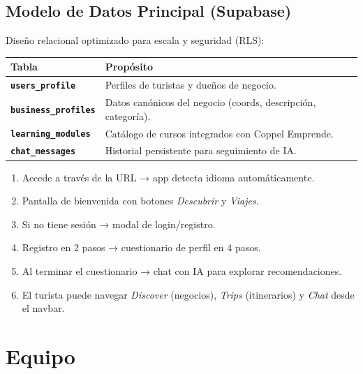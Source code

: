 \documentclass[11pt,a4paper]{article}
\begin{document}
\subsection{Modelo de Datos Principal (Supabase)}

Diseño relacional optimizado para escala y seguridad (RLS):

\begin{center}
\begin{tabular}{>{\bfseries}p{3.5cm} p{10cm}}
\toprule
Tabla & Propósito \\
\midrule
\texttt{users\_profile}     & Perfiles de turistas y dueños de negocio. \\
\texttt{business\_profiles}  & Datos canónicos del negocio (coords, descripción, categoría). \\
\texttt{learning\_modules}   & Catálogo de cursos integrados con Coppel Emprende. \\
\texttt{chat\_messages}      & Historial persistente para seguimiento de IA. \\
\bottomrule
\end{tabular}
\end{center}

\begin{enumerate}[leftmargin=*, itemsep=3pt]
  \item Accede a través de la URL → app detecta idioma automáticamente.
  \item Pantalla de bienvenida con botones \textit{Descubrir} y \textit{Viajes}.
  \item Si no tiene sesión → modal de login/registro.
  \item Registro en 2 pasos → cuestionario de perfil en 4 pasos.
  \item Al terminar el cuestionario → chat con IA para explorar recomendaciones.
  \item El turista puede navegar \textit{Discover} (negocios), \textit{Trips}
        (itinerarios) y \textit{Chat} desde el navbar.
\end{enumerate}

\section{Equipo}
\end{document}
